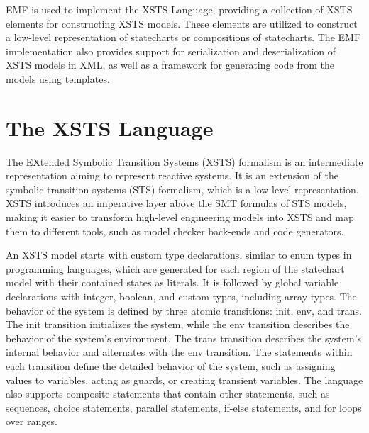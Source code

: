 EMF is used to implement the XSTS Language, providing a collection of XSTS elements for constructing XSTS models. These elements are utilized to construct a low-level representation of statecharts or compositions of statecharts. The EMF implementation also provides support for serialization and deserialization of XSTS models in XML, as well as a framework for generating code from the models using templates.

\section{The XSTS Language}

The EXtended Symbolic Transition Systems\cite{XSTS} (XSTS) formalism is an intermediate representation aiming to represent reactive systems. It is an extension of the symbolic transition systems (STS) formalism, which is a low-level representation. XSTS introduces an imperative layer above the SMT formulas of STS models, making it easier to transform high-level engineering models into XSTS and map them to different tools, such as model checker back-ends and code generators.

An XSTS model starts with custom type declarations, similar to enum types in programming languages, which are generated for each region of the statechart model with their contained states as literals. It is followed by global variable declarations with integer, boolean, and custom types, including array types. The behavior of the system is defined by three atomic transitions: init, env, and trans. The init transition initializes the system, while the env transition describes the behavior of the system's environment. The trans transition describes the system's internal behavior and alternates with the env transition. The statements within each transition define the detailed behavior of the system, such as assigning values to variables, acting as guards, or creating transient variables. The language also supports composite statements that contain other statements, such as sequences, choice statements, parallel statements, if-else statements, and for loops over ranges.